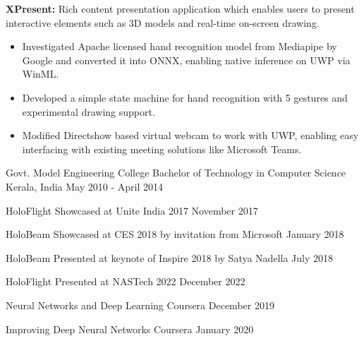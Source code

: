 \documentclass[11pt, a4paper]{awesome-cv}
\begin{document}
\begin{cventries}
{\begin{cvitems}
\begin{itemize}
				\end{itemize}
			\item \textbf{XPresent:} Rich content presentation application which enables users to present interactive elements such as 3D models and real-time on-screen drawing.
				\begin{itemize} 
					\item Investigated Apache licensed hand recognition model from Mediapipe by Google and converted it into ONNX, enabling native inference on UWP via WinML.
					\item Developed a simple state machine for hand recognition with 5 gestures and experimental drawing support.
					\item Modified Directshow based virtual webcam to work with UWP, enabling easy interfacing with existing meeting solutions like Microsoft Teams.
				\end{itemize}
		\end{cvitems}
	}
\end{cventries}

\vspace{-1mm}
\begin{cventries}
	\cventry
	{Govt. Model Engineering College} %
	{Bachelor of Technology in Computer Science} %
	{Kerala, India} %
	{May 2010 - April 2014} %
	{
	}
\end{cventries}


\vspace{-6mm}
\begin{cvhonors}
	\cvrecognition
		{HoloFlight} %
		{Showcased at Unite India 2017} %
		{November 2017} %
		{}
		
	\cvrecognition
		{HoloBeam} %
		{Showcased at CES 2018 by invitation from Microsoft} %
		{January 2018} %
		{}
		
	\cvrecognition
		{HoloBeam} %
		{Presented at keynote of Inspire 2018 by Satya Nadella} %
		{July 2018} %
		{}

	\cvrecognition
		{HoloFlight} %
		{Presented at NASTech 2022} %
		{December 2022} %
		{}
\end{cvhonors}

\vspace{2mm}
\begin{cvhonors}
	\cvcertification
	{Neural Networks and Deep Learning} %
	{Coursera} %
	{December 2019} %
	{}

	\cvcertification
	{Improving Deep Neural Networks} %
	{Coursera} %
	{January 2020} %
	{}
\end{cvhonors}
\end{document}
